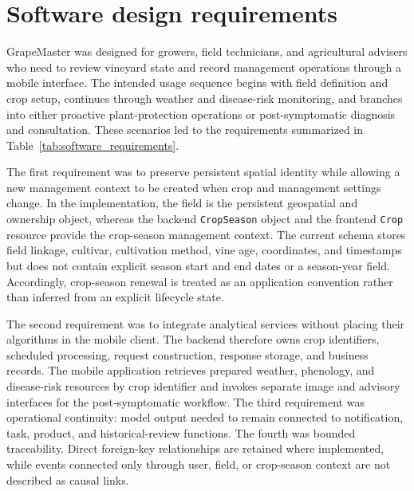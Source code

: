 \documentclass[12pt]{article}
\begin{document}
\section{Software design requirements}\label{software-design-requirements}

GrapeMaster was designed for growers, field technicians, and agricultural advisers who need to review vineyard state and record management operations through a mobile interface. The intended usage sequence begins with field definition and crop setup, continues through weather and disease-risk monitoring, and branches into either proactive plant-protection operations or post-symptomatic diagnosis and consultation. These scenarios led to the requirements summarized in Table~\ref{tab:software_requirements}.

The first requirement was to preserve persistent spatial identity while allowing a new management context to be created when crop and management settings change. In the implementation, the field is the persistent geospatial and ownership object, whereas the backend \texttt{CropSeason} object and the frontend \texttt{Crop} resource provide the crop-season management context. The current schema stores field linkage, cultivar, cultivation method, vine age, coordinates, and timestamps but does not contain explicit season start and end dates or a season-year field. Accordingly, crop-season renewal is treated as an application convention rather than inferred from an explicit lifecycle state.

The second requirement was to integrate analytical services without placing their algorithms in the mobile client. The backend therefore owns crop identifiers, scheduled processing, request construction, response storage, and business records. The mobile application retrieves prepared weather, phenology, and disease-risk resources by crop identifier and invokes separate image and advisory interfaces for the post-symptomatic workflow. The third requirement was operational continuity: model output needed to remain connected to notification, task, product, and historical-review functions. The fourth was bounded traceability. Direct foreign-key relationships are retained where implemented, while events connected only through user, field, or crop-season context are not described as causal links.
\end{document}
